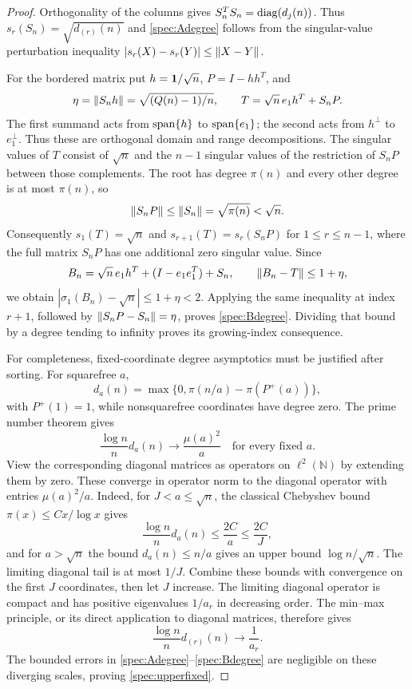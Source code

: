 \begin{proof}
Orthogonality of the columns gives $S_n^TS_n=\operatorname{diag}(d_j(n))$. Thus $s_r(S_n)=\sqrt{d_{(r)}(n)}$ and \eqref{spec:Adegree} follows from the singular-value perturbation inequality $|s_r(X)-s_r(Y)|\le\left\lVert X-Y\right\rVert$.

For the bordered matrix put $h=\mathbf{1}/\sqrt n$, $P=I-hh^T$, and
\[
 \eta=\left\lVert S_nh\right\rVert=\sqrt{(Q(n)-1)/n},\qquad
 T=\sqrt n\,e_1h^T+S_nP.
\]
The first summand acts from $\operatorname{span}\{h\}$ to $\operatorname{span}\{e_1\}$; the second acts from $h^\perp$ to $e_1^\perp$. Thus these are orthogonal domain and range decompositions. The singular values of $T$ consist of $\sqrt n$ and the $n-1$ singular values of the restriction of $S_nP$ between those complements. The root has degree $\pi(n)$ and every other degree is at most $\pi(n)$, so
\[
 \left\lVert S_nP\right\rVert\le\left\lVert S_n\right\rVert=\sqrt{\pi(n)}<\sqrt n.
\]
Consequently $s_1(T)=\sqrt n$ and $s_{r+1}(T)=s_r(S_nP)$ for $1\le r\le n-1$, where the full matrix $S_nP$ has one additional zero singular value. Since
\[
 B_n=\sqrt n\,e_1h^T+(I-e_1e_1^T)+S_n,
 \qquad \left\lVert B_n-T\right\rVert\le1+\eta,
\]
we obtain $|\sigma_1(B_n)-\sqrt n|\le1+\eta<2$. Applying the same inequality at index $r+1$, followed by $\left\lVert S_nP-S_n\right\rVert=\eta$, proves \eqref{spec:Bdegree}. Dividing that bound by a degree tending to infinity proves its growing-index consequence.

For completeness, fixed-coordinate degree asymptotics must be justified after sorting. For squarefree $a$,
\[
 d_a(n)=\max\{0,\pi(n/a)-\pi(P^+(a))\},
\]
with $P^+(1)=1$, while nonsquarefree coordinates have degree zero. The prime number theorem gives
\[
 \frac{\log n}{n}d_a(n)\longrightarrow\frac{\mu(a)^2}{a}
 \quad\text{for every fixed }a.
\]
View the corresponding diagonal matrices as operators on $\ell^2(\mathbb N)$ by extending them by zero. These converge in operator norm to the diagonal operator with entries $\mu(a)^2/a$. Indeed, for $J<a\le\sqrt n$, the classical Chebyshev bound $\pi(x)\le Cx/\log x$ gives
\[
 \frac{\log n}{n}d_a(n)\le\frac{2C}{a}\le\frac{2C}{J},
\]
and for $a>\sqrt n$ the bound $d_a(n)\le n/a$ gives an upper bound $\log n/\sqrt n$. The limiting diagonal tail is at most $1/J$. Combine these bounds with convergence on the first $J$ coordinates, then let $J$ increase. The limiting diagonal operator is compact and has positive eigenvalues $1/a_r$ in decreasing order. The min--max principle, or its direct application to diagonal matrices, therefore gives
\[
 \frac{\log n}{n}d_{(r)}(n)\longrightarrow\frac1{a_r}.
\]
The bounded errors in \eqref{spec:Adegree}--\eqref{spec:Bdegree} are negligible on these diverging scales, proving \eqref{spec:upperfixed}.
\end{proof}

